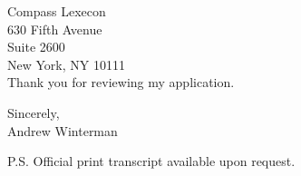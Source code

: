 \documentclass[11pt]{letter} %
\begin{document}
\begin{letter}{
Compass Lexecon \\
630 Fifth Avenue\\
Suite 2600\\
New York, NY 10111\\
 }
Thank you for reviewing my application.

Sincerely, \\
Andrew Winterman

P.S. Official print transcript available upon request.
\end{letter}
 
\end{document}
